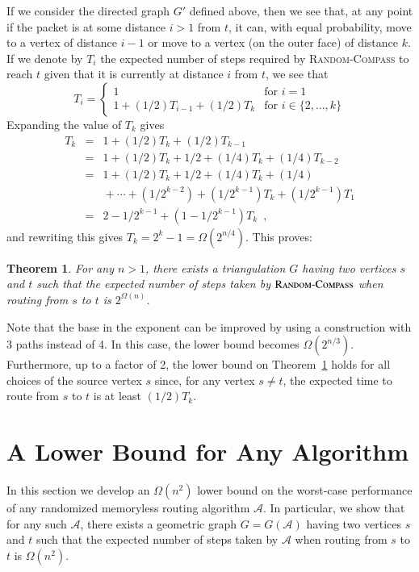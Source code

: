\documentclass{elsarticle}
\newtheorem{theorem}{Theorem}%
\begin{document}
If we consider the directed graph $G'$ defined above, then we see that, at any point if the packet is at some distance $i > 1$ from $t$, it can, with equal probability, move to a vertex  of distance $i-1$ or move to a vertex (on the outer face) of distance $k$.  If we denote by $T_i$ the expected number of steps required by \textsc{Random-Compass} to reach $t$ given that it is currently at distance $i$ from $t$, we see that 
\[ 
  T_i = \left\{ \begin{array}{ll}
          1 & \mbox{for $i=1$} \\
          1 + (1/2)T_{i-1} + (1/2)T_k & \mbox{for $i\in\{2,\ldots,k\}$} 
        \end{array}\right.
\]
Expanding the value of $T_k$ gives
\begin{eqnarray*}
  T_k & = & 1 + (1/2)T_k + (1/2)T_{k-1} \\
      & = & 1 + (1/2)T_k + 1/2 + (1/4)T_{k} + (1/4)T_{k-2} \\
      & = & 1 + (1/2)T_k + 1/2 + (1/4)T_{k} + (1/4)
              \\ && {} + \cdots  + (1/2^{k-2}) + (1/2^{k-1})T_{k} + (1/2^{k-1})T_1 \\
      & = & 2-1/2^{k-1} + (1-1/2^{k-1})T_k \enspace ,
\end{eqnarray*}
and rewriting this gives $T_k = 2^{k} - 1 = \Omega(2^{n/4})$.  This proves:

\begin{theorem}\label{theorem:random-compass}
For any $n>1$, there exists a triangulation $G$ having two vertices $s$ and $t$ such that the expected number of steps taken by $\textsc{Random-Compass}$ when routing from $s$ to $t$ is $2^{\Omega(n)}$.
\end{theorem}

Note that the base in the exponent can be improved by using a construction with 3 paths instead of 4.  In this case, the lower bound becomes $\Omega(2^{n/3})$.  Furthermore, up to a factor of 2, the lower bound on Theorem~\ref{theorem:random-compass} holds for all choices of the source vertex $s$ since, for any vertex $s\neq t$, the expected time to route from $s$ to $t$ is at least $(1/2)T_k$.

\section{A Lower Bound for Any Algorithm}

In this section we develop an $\Omega(n^2)$ lower bound on the worst-case
performance of any randomized memoryless routing algorithm $\mathcal{A}$.
In particular, we show that for any such $\mathcal{A}$, there exists a
geometric graph $G=G(\mathcal{A})$ having two vertices $s$ and $t$ such
that the expected number of steps taken by $\mathcal{A}$ when routing
from $s$ to $t$ is $\Omega(n^2)$.
\end{document}
